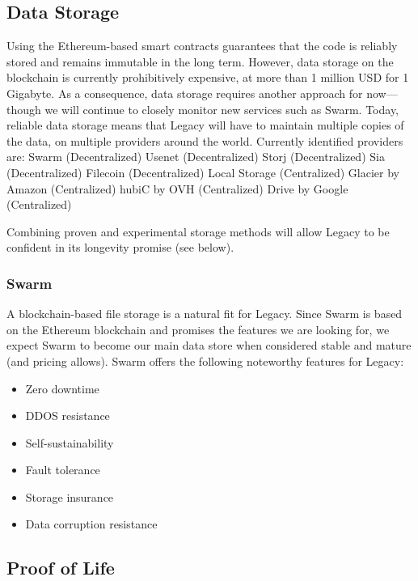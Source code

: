 \subsection{Data Storage} %
\label{sub:data_storage}
Using the Ethereum-based smart contracts guarantees that the code is reliably stored and remains immutable in the long term. However, data storage on the blockchain is currently prohibitively expensive, at more than 1 million USD for 1 Gigabyte. As a consequence, data storage requires another approach for now---though we will continue to closely monitor new services such as Swarm.
Today, reliable data storage means that Legacy will have to maintain multiple copies of the data, on multiple providers around the world.
Currently identified providers are:
Swarm (Decentralized)
Usenet (Decentralized)
Storj (Decentralized)
Sia (Decentralized)
Filecoin (Decentralized)
Local Storage (Centralized)
Glacier by Amazon (Centralized)
hubiC by OVH (Centralized)
Drive by Google (Centralized)

Combining proven and experimental storage methods will allow Legacy to be confident in its longevity promise (see below).

\subsubsection*{Swarm} %
\label{ssub:swarm}
A blockchain-based file storage is a natural fit for Legacy. Since Swarm is based on the Ethereum blockchain and promises the features we are looking for, we expect Swarm to become our main data store when considered stable and mature (and pricing allows).
Swarm offers the following noteworthy features for Legacy:
\begin{itemize}
	\item Zero downtime
	\item DDOS resistance
	\item Self-sustainability
	\item Fault tolerance
	\item Storage insurance
	\item Data corruption resistance
\end{itemize}


\subsection{Proof of Life} %
\label{sub:proof_of_life}

